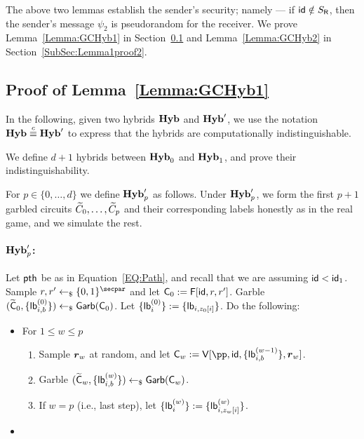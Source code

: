The above two lemmas establish the sender's security; namely --- if $\mathsf{id} \notin S_{\mathsf{R}}$, then the sender's  message $\psi_2$ is pseudorandom for the receiver. We prove  Lemma~\ref{Lemma:GCHyb1} in Section~\ref{SubSec:Lemma1proof} and Lemma~\ref{Lemma:GCHyb2} in Section~\ref{SubSec:Lemma1proof2}. 


\subsection{Proof of Lemma~\ref{Lemma:GCHyb1}}\label{SubSec:Lemma1proof}
In the following, given two hybrids $\mathsf{\mathbf{Hyb}}$ and $\mathsf{\mathbf{Hyb}}'$, we use the notation $\mathsf{\mathbf{Hyb}} \stackrel{c}{\equiv} \mathsf{\mathbf{Hyb}}'$ to express that the hybrids are computationally indistinguishable.

We define $d+1$ hybrids between $\mathsf{\mathbf{Hyb}}_0$ and $\mathsf{\mathbf{Hyb}}_1$, and prove their indistinguishability.

For $p \in \{0, \dots , d\}$ we define $\mathsf{\mathbf{Hyb}}'_{p}$ as follows. Under $\mathsf{\mathbf{Hyb}}'_{p}$, we form the first $p+1$ garbled circuits $\widetilde{C}_0, \dots, \widetilde{C}_p$ and their corresponding labels honestly as in the real game, and we simulate the rest.

\paragraph{$\mathsf{\mathbf{Hyb}}'_{p}$:} Let $\mathsf{pth}$ be as in Equation~\ref{EQ:Path}, and recall that we are assuming $\mathsf{id} < \mathsf{id}_1$. Sample $r, r' \pick \bits^\secpar$  and let $\mathsf{C}_0 := \mathsf{F}[\mathsf{id}, r , r']$. Garble $(\widetilde{\mathsf{C}}_0 , \{\mathsf{lb}_{i,b}^{(0)} \}) \leftarrow_\$ \mathsf{Garb}(\mathsf{C}_0)$. Let $\{ \mathsf{lb}_i^{(0)}\} := \{\mathsf{lb}_{i, z_0[i]}\}$. Do the following:

\begin{itemize}
    \item For $1 \leq w \leq p$ 
       \begin{enumerate}
           \item Sample $\boldsymbol{r}_w$ at random, and let $\al{C}_w := \al{V}[\pp , \id,  \{\lb_{i,b}^{(w-1)}\},   \bo{r}_w]$. 
           \item Garble  $(\widetilde{\mathsf{C}}_w , \{\mathsf{lb}_{i,b}^{(w)} \}) \leftarrow_\$ \mathsf{Garb}(\mathsf{C}_w)$.
           \item If $w = p$ (i.e., last step), let $\{\mathsf{lb}_i^{(w)}\} := \{\mathsf{lb}_{i, z_w[i]}^{(w)}\}$.
       \end{enumerate}
   
\item {}
\end{itemize}

